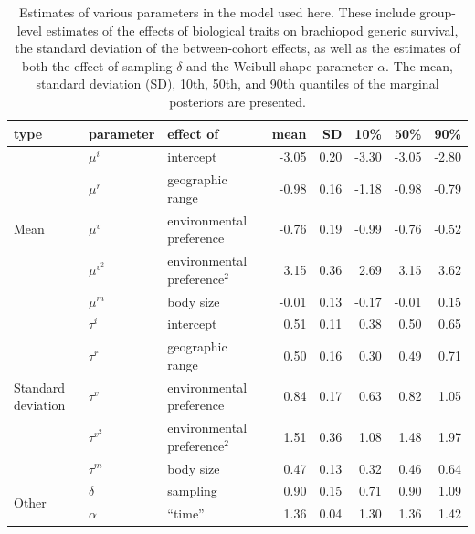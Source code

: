 \documentclass{article}
\begin{document}
\begin{table}
  \centering
  \caption{Estimates of various parameters in the model used here. These include group-level estimates of the effects of biological traits on brachiopod generic survival, the standard deviation of the between-cohort effects, as well as the estimates of both the effect of sampling \(\delta\) and the Weibull shape parameter \(\alpha\). The mean, standard deviation (SD), 10th, 50th, and 90th quantiles of the marginal posteriors are presented.}
  \begin{tabular}{ l | l p{2.5cm} r r r r r }
    \hline
    type & parameter & effect of & mean & SD & 10\% & 50\% & 90\% \\ 
    \hline
    \multirow{5}{*}{Mean} & \(\mu^{i}\) & intercept & -3.05 & 0.20 & -3.30 & -3.05 & -2.80 \\
    & \(\mu^{r}\) & geographic range & -0.98 & 0.16 & -1.18 & -0.98 & -0.79 \\
    & \(\mu^{v}\) & environmental preference & -0.76 & 0.19 & -0.99 & -0.76 & -0.52 \\
    & \(\mu^{v^{2}}\) & environmental preference\(^{2}\) & 3.15 & 0.36 & 2.69 & 3.15 & 3.62 \\
    & \(\mu^{m}\) & body size &  -0.01 & 0.13 & -0.17 & -0.01 & 0.15 \\
    \hline
    \multirow{5}{*}{Standard deviation} & \(\tau^{i}\) & intercept & 0.51 & 0.11 & 0.38 & 0.50 & 0.65 \\
    & \(\tau^{r}\) & geographic range & 0.50 & 0.16 & 0.30 & 0.49 & 0.71 \\ 
    & \(\tau^{v}\) & environmental preference & 0.84 & 0.17 & 0.63 & 0.82 & 1.05 \\
    & \(\tau^{v^{2}}\) & environmental preference\(^{2}\) & 1.51 & 0.36 & 1.08 & 1.48 & 1.97 \\
    & \(\tau^{m}\) & body size & 0.47 & 0.13 & 0.32 & 0.46 & 0.64 \\ 
    \hline
    \multirow{2}{*}{Other} & \(\delta\) & sampling & 0.90 & 0.15 & 0.71 & 0.90 & 1.09 \\ 
    & \(\alpha\) & ``time'' & 1.36 & 0.04 & 1.30 & 1.36 & 1.42 \\ 
    \hline
  \end{tabular}
  \label{tab:param}
\end{table}


\clearpage
\end{document}
